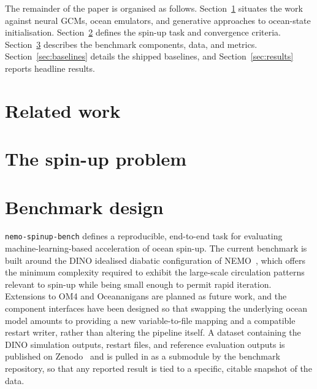 \documentclass{article}
\begin{document}
The remainder of the paper is organised as follows.
Section~\ref{sec:related} situates the work against neural GCMs,
ocean emulators, and generative approaches to ocean-state
initialisation. Section~\ref{sec:problem} defines the spin-up task
and convergence criteria. Section~\ref{sec:benchmark} describes the
benchmark components, data, and metrics. Section~\ref{sec:baselines}
details the shipped baselines, and Section~\ref{sec:results} reports
headline results.


\section{Related work}
\label{sec:related}



\section{The spin-up problem}
\label{sec:problem}



\section{Benchmark design}
\label{sec:benchmark}

\texttt{nemo-spinup-bench} defines a reproducible, end-to-end task for
evaluating machine-learning-based acceleration of ocean spin-up. The
current benchmark is built around the DINO idealised diabatic
configuration of NEMO~\citep{kamm_dino_2025}, which offers the minimum
complexity required to exhibit the large-scale circulation patterns
relevant to spin-up while being small enough to permit rapid iteration.
Extensions to OM4 and Oceananigans are planned as future work, and the
component interfaces have been designed so that swapping the underlying
ocean model amounts to providing a new variable-to-file mapping and a
compatible restart writer, rather than altering the pipeline itself. A dataset containing the
DINO simulation outputs, restart files, and reference evaluation outputs
is published on Zenodo~\citep{archer_dino_dataset_2026} and is pulled in
as a submodule by the benchmark repository, so that any reported result
is tied to a specific, citable snapshot of the data.
\end{document}

